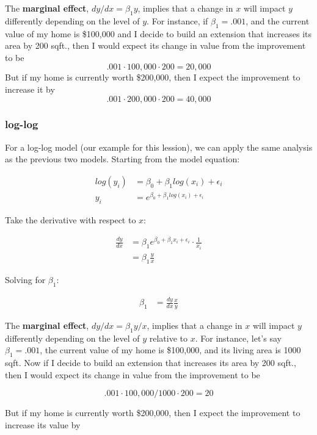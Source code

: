 \documentclass[10pt]{article}\usepackage[]{graphicx}\usepackage[]{color}
\begin{document}
The \textbf{marginal effect}, $dy / dx = \beta_1 y$, implies that a change in $x$ will impact $y$ differently depending on the level of $y$. For instance, if $\beta_1 = .001$, and the current value of my home is \$100,000 and I decide to build an extension that increases its area by 200 sqft., then I would expect its change in value from the improvement to be $$.001 \cdot 100,000 \cdot 200 = 20,000$$ But if my home is currently worth \$200,000, then I expect the improvement to increase it by $$.001 \cdot 200,000 \cdot 200 = 40,000$$

\subsubsection*{log-log}

For a log-log model (our example for this lession), we can apply the same analysis as the previous two models. Starting from the model equation:

\begin{align}
log(y_i) &=  \beta_0 + \beta_1 log(x_i) + \epsilon_i \\
y_i &= e^{\beta_0 + \beta_1 log(x_i) + \epsilon_i}
\end{align}

Take the derivative with respect to $x$:

\begin{align}
\frac{dy}{dx} &= \beta_1 e^{\beta_0 + \beta_1 x_i + \epsilon_i} \cdot \frac{1}{x_i} \\
 &= \beta_1 \frac{y}{x} 
\end{align}

Solving for $\beta_1$:

\begin{align}
 \beta_1 &= \frac{dy}{dx} \frac{x}{y}
\end{align}

The \textbf{marginal effect}, $dy / dx = \beta_1 y / x$, implies that a change in $x$ will impact $y$ differently depending on the level of $y$ relative to $x$. For instance, let's say $\beta_1 = .001$, the current value of my home is \$100,000, and its living area is 1000 sqft. Now if I decide to build an extension that increases its area by 200 sqft., then I would expect its change in value from the improvement to be 

$$.001 \cdot 100,000 / 1000 \cdot 200 = 20$$ 

But if my home is currently worth \$200,000, then I expect the improvement to increase its value by 
\end{document}

